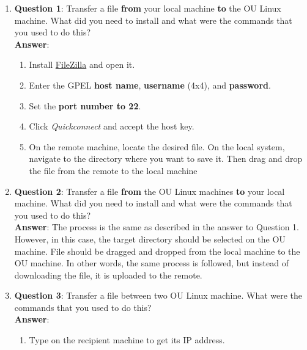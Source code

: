 \begin{enumerate}[label=(\arabic*)]
    \item \textbf{Question 1}: Transfer a file \textbf{from} your local machine
          \textbf{to} the OU Linux machine. What did you need to install and
          what were the commands that you used to do this?
          \\
          \textbf{Answer}:
          \begin{enumerate}
            \item Install \href{https://filezilla-project.org/}{FileZilla} and
                  open it.
                  
            \item Enter the GPEL \textbf{host name}, \textbf{username} (4x4),
                  and \textbf{password}.

            \item Set the \textbf{port number to 22}.
            
            \item Click \textit{Quickconnect} and accept the host key.
            
            \item On the remote machine, locate the desired file. On the local
                  system, navigate to the directory where you want to save it.
                  Then drag and drop the file from the remote to the local
                  machine 
          \end{enumerate}

    \item \textbf{Question 2}: Transfer a file \textbf{from} the OU Linux
          machines \textbf{to} your local machine. What did you need to install
          and what were the commands that you used to do this?
          \\
          \textbf{Answer}: The process is the same as described in the answer to
          Question 1. However, in this case, the target directory should be
          selected on the OU machine. File should be dragged and dropped from
          the local machine to the OU machine. In other words, the same process
          is followed, but instead of downloading the file, it is uploaded to
          the remote.

    \item \textbf{Question 3}: Transfer a file between two OU Linux machine.
          What were the commands that you used to do this?
          \\
          \textbf{Answer}:
          \begin{enumerate}
            \item Type  on the recipient machine to get its IP
                  address.


\end{enumerate}
\end{enumerate}
